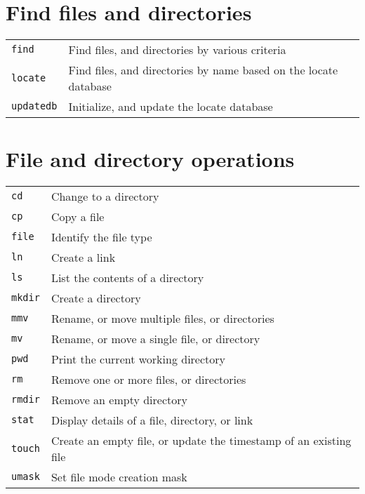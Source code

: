 \documentclass[10pt]{article}
\begin{document}
\begin{multicols}{2}
~\\
\vfill

\section{Find files and directories}
\begin{tabular}{ p{2.5cm} p{8.5cm} }
  \hline
  \texttt{find} & Find files, and directories by various criteria \\
  \rowcolor{Gray}
  \texttt{locate} & Find files, and directories by name based on the locate database \\
  \texttt{updatedb} & Initialize, and update the locate database \\
  \hline
\end{tabular}


\columnbreak

\section{File and directory operations}
\begin{tabular}{ p{2.5cm} p{8.5cm} }
  \hline
  \texttt{cd} & Change to a directory \\
  \rowcolor{Gray}
  \texttt{cp} & Copy a file \\
  \texttt{file} & Identify the file type \\
  \rowcolor{Gray}
  \texttt{ln} & Create a link \\
  \texttt{ls} & List the contents of a directory \\
  \rowcolor{Gray}
  \texttt{mkdir} & Create a directory \\
  \texttt{mmv} & Rename, or move multiple files, or directories \\
  \rowcolor{Gray}
  \texttt{mv} & Rename, or move a single file, or directory \\
  \texttt{pwd} & Print the current working directory \\
  \rowcolor{Gray}
  \texttt{rm} & Remove one or more files, or directories \\
  \texttt{rmdir} & Remove an empty directory \\
  \rowcolor{Gray}
  \texttt{stat} & Display details of a file, directory, or link\\
  \texttt{touch} & Create an empty file, or update the timestamp of an existing file \\
  \rowcolor{Gray}
  \texttt{umask} & Set file mode creation mask \\
  \hline
\end{tabular}


\end{multicols}
\end{document}
